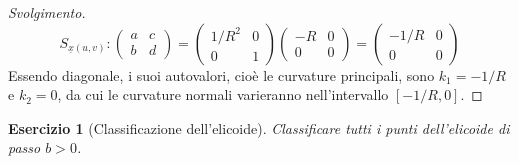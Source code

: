 \documentclass[12pt]{scrartcl}
\theoremstyle{style}
\newtheorem{esercizio}{Esercizio}[section]
\newenvironment{svolgimento}{\renewcommand\qedsymbol{$\blacksquare$}\begin{proof}[Svolgimento]}{\end{proof}}
\numberwithin{equation}{subsection}
\begin{document}
\begin{svolgimento}
\[
	S_{\underline{x}(u,v)} : \begin{pmatrix} a & c \\ b & d \end{pmatrix}  = \begin{pmatrix} 1/R^2 & 0 \\ 0 & 1  \end{pmatrix} \begin{pmatrix} -R & 0 \\ 0 & 0 \end{pmatrix} = \begin{pmatrix} - 1 / R & 0 \\ 0& 0 \end{pmatrix} 
\] 
Essendo diagonale, i suoi autovalori, cio\`e le curvature principali, sono $k_1 =- 1 / R$ e $ k_2 = 0$, da cui le curvature normali varieranno nell'intervallo $[-1 / R , 0]$.
\end{svolgimento}
\begin{esercizio}
	[Classificazione dell'elicoide]
	Classificare tutti i punti dell'elicoide di passo $b > 0$.
\end{esercizio}
\end{document}
